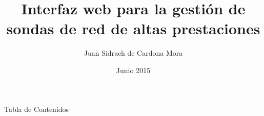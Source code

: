 \documentclass[10pt, compress]{beamer}
\title{Interfaz web para la gestión de sondas de red de altas prestaciones}
\date{Junio 2015}
\author{Juan Sidrach de Cardona Mora}
\institute{High-Performance Computing and Networking}
\begin{document}
\maketitle

\begin{frame}{Tabla de Contenidos}
  \tableofcontents
\end{frame}













\end{document}

